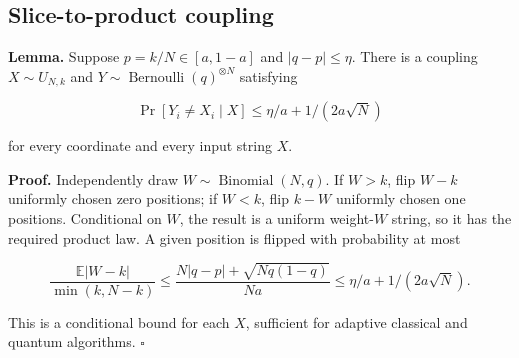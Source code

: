 \subsection{Slice-to-product coupling}\label{exch:sec-3}

\textbf{Lemma.} Suppose \(p=k/N\in[a,1-a]\) and \(|q-p|\le\eta\). There
is a coupling \(X\sim U_{N,k}\) and
\(Y\sim\operatorname{Bernoulli}(q)^{\otimes N}\) satisfying

\[
\Pr[Y_i\ne X_i\mid X]\le\eta/a+1/(2a\sqrt N)
\]

for every coordinate and every input string \(X\).

\textbf{Proof.} Independently draw
\(W\sim\operatorname{Binomial}(N,q)\). If \(W>k\), flip \(W-k\)
uniformly chosen zero positions; if \(W<k\), flip \(k-W\) uniformly
chosen one positions. Conditional on \(W\), the result is a uniform
weight-\(W\) string, so it has the required product law. A given
position is flipped with probability at most

\[
\frac{\mathbb E|W-k|}{\min(k,N-k)}
\le\frac{N|q-p|+\sqrt{Nq(1-q)}}{Na}
\le\eta/a+1/(2a\sqrt N).
\]

This is a conditional bound for each \(X\), sufficient for adaptive
classical and quantum algorithms. \(\square\)
